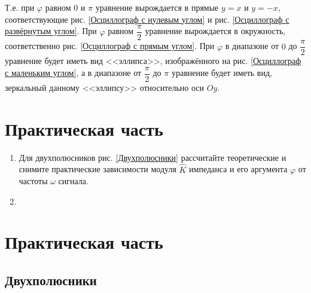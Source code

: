 \documentclass[a4paper, usenames, dvipsnames]{article}
\begin{document}
Т.е. при $\varphi$ равном $0$ и $\pi$ уравнение вырождается в прямые $y = x$ и $y = -x$,
соответствующие рис. \ref{Осциллограф с нулевым углом} и рис. \ref{Осциллограф с развёрнутым углом}.
При $\varphi$ равном $\dfrac{\pi}{2}$ уравнение вырождается в окружность, соответственно рис. \ref{Осциллограф с прямым углом}.
При $\varphi$ в диапазоне от $0$ до $\dfrac{\pi}{2}$ уравнение будет иметь вид <<эллипса>>,
изображённого на рис. \ref{Осциллограф с маленьким углом}, а в диапазоне от $\dfrac{\pi}{2}$ до $\pi$ уравнение будет иметь вид,
зеркальный данному <<эллипсу>> относительно оси $Oy$.

\section*{\centering Практическая часть}

\begin{enumerate}
    \item Для двухполюсников рис. \ref{Двухполюсники} рассчитайте теоретические
    и снимите практические зависимости модуля $\hat{K}$ импеданса
    и его аргумента $\varphi$ от частоты $\omega$ сигнала.
    \item 
\end{enumerate}

\newpage\section*{\centering Практическая часть}

\subsection*{Двухполюсники}
\end{document}
